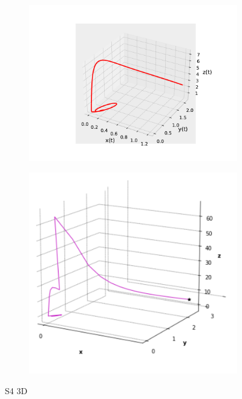 \documentclass{wscpaperproc}
\theoremstyle{wsc}
\begin{document}
\begin{figure}[h]
	\centering
	\begin{subfigure}[b]{0.5\textwidth}
		\centering
		\includegraphics[width=\textwidth]{Simulations/S43d.pdf}
	
		\label{fig:comparativa3D41}
	\end{subfigure}%
	\begin{subfigure}[b]{0.5\textwidth}
		\centering
		\includegraphics[width=\textwidth]{GraficasPaper/S4[3d].png}
		\label{fig:comparativa3D42}
	\end{subfigure}
	\caption{S4 3D}

	\label{fig:comparacion12}
\end{figure}
\end{document}
